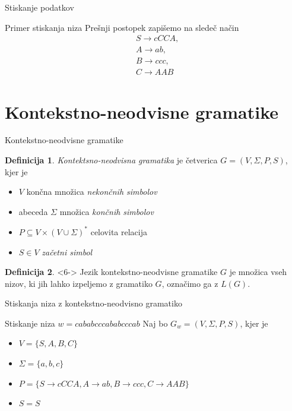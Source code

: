 \documentclass{beamer}
\theoremstyle{definition} %
\newtheorem{definicija}{Definicija}[section]
\begin{document}
\begin{frame}{Stiskanje podatkov}
    \begin{exampleblock}{Primer stiskanja niza}
        Prešnji postopek zapišemo na sledeč način
        \begin{align*}
            & S  \rightarrow  \mathit{cCCA}, \\
            & A  \rightarrow  \mathit{ab}, \\
            & B  \rightarrow  \mathit{ccc}, \\
            & C  \rightarrow  \mathit{AAB}
        \end{align*}
    \end{exampleblock}
\end{frame}

\section*{Kontekstno-neodvisne gramatike}

\begin{frame}{Kontekstno-neodvisne gramatike}
    \begin{definicija}
        \textit{Kontektsno-neodvisna gramatika} je četverica $ G = ( V, \Sigma, P, S ) $, kjer je
        \begin{itemize}
            \item<2-> $ V $ končna množica \textit{nekončnih simbolov}
            \item<3-> abeceda $ \Sigma $ množica \textit{končnih simbolov}
            \item<4-> $ P \subseteq V \times ( V \cup \Sigma )^* $ celovita relacija
            \item<5-> $ S \in V $ \textit{začetni simbol}
        \end{itemize}
    \end{definicija}
    \begin{definicija}<6->
        Jezik kontekstno-neodvisne gramatike $ G $ je množica vseh nizov, ki jih lahko izpeljemo
        z gramatiko $ G $, označimo ga z $ L(G) $.
    \end{definicija}
\end{frame}

\begin{frame}{Stiskanja niza z kontekstno-neodvisno gramatiko}
    \begin{exampleblock}{Stiskanje niza $ w = \mathit{cababcccababcccab} $}
        Naj bo $ G_w = ( V, \Sigma, P, S ) $, kjer je 
        \begin{itemize}
            \item<2-> $ V = \{ S, A, B, C \} $
            \item<3-> $ \Sigma = \{ a, b, c \} $
            \item<4-> $ P = \{ S  \rightarrow  \mathit{cCCA}, A  \rightarrow  \mathit{ab}, B  
            \rightarrow  \mathit{ccc}, C  \rightarrow  \mathit{AAB} \} $
            \item<5-> $ S = S $
        \end{itemize}
        \pause
    \end{exampleblock}
\end{frame}
\end{document}
